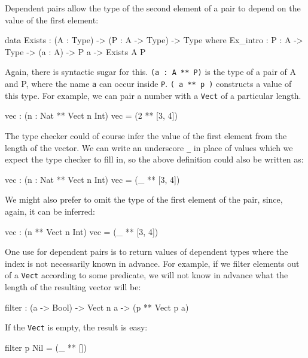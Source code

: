 Dependent pairs allow the type of the second element of a pair to depend on the value of the first element:

\begin{code}
data Exists : (A : Type) -> (P : A -> Type) -> Type where
   Ex_intro : {P : A -> Type} -> (a : A) -> P a -> Exists A P
\end{code}

\noindent
Again, there is syntactic sugar for this. \texttt{(a : A ** P)} is the type of a pair of A and P, where the name \texttt{a} can occur inside \texttt{P}.
\texttt{( a ** p )}  constructs a value of this type. For example, we can pair a number with a  \texttt{Vect} of a particular length.

\begin{code}
vec : (n : Nat ** Vect n Int)
vec = (2 ** [3, 4])
\end{code}

\noindent
The type checker could of course infer the value of the first element from the
length of the vector.
We can write an underscore \texttt{\_} in place of values which we expect the type checker to fill in, so the above definition could also be written as:

\begin{code}
vec : (n : Nat ** Vect n Int)
vec = (_ ** [3, 4])
\end{code}


\noindent
We might also prefer to omit the type of the first element of the pair, since, again, it can be inferred:

\begin{code}
vec : (n ** Vect n Int)
vec = (_ ** [3, 4])
\end{code}

\noindent
One use for dependent pairs is to return values of dependent types where the index is not necessarily known in advance.
For example, if we filter elements out of a \texttt{Vect} according to some predicate, we will not know in advance what the length of the resulting vector will be:

\begin{code}
filter : (a -> Bool) -> Vect n a -> (p ** Vect p a)
\end{code}


\noindent
If the \texttt{Vect} is empty, the result is easy:

\begin{code}
filter p Nil = (_ ** [])
\end{code}


